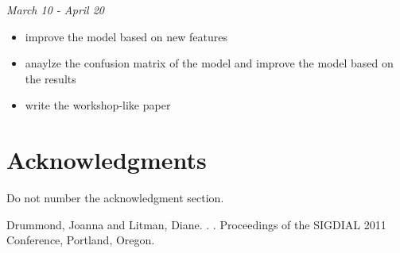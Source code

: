 \documentclass[11pt,letterpaper]{article}
\begin{document}
\noindent \emph{March 10 - April 20}
\begin{itemize}
  \item improve the model based on new features
  \item anaylze the confusion matrix of the model and improve the model based on the results
  \item write the workshop-like paper
\end{itemize}

\section*{Acknowledgments}

Do not number the acknowledgment section.

\begin{thebibliography}{}
Drummond, Joanna and Litman, Diane.
.
.
\newblock Proceedings of the SIGDIAL 2011 Conference, Portland, Oregon.

\end{thebibliography}
\end{document}
